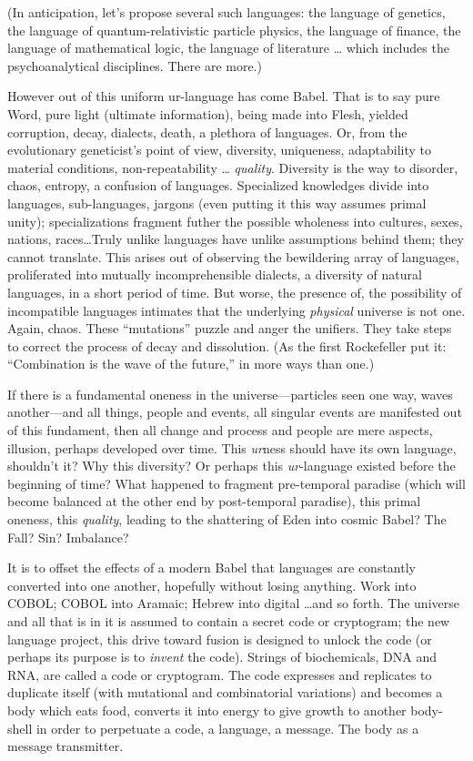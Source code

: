 \documentclass[11pt,twoside,draft]{memoir}
\begin{document}
(In anticipation, let's propose several such languages:
the language of genetics, the language of quantum-relativistic 
particle physics, the language of finance, the language of
mathematical logic, the language of literature \ldots
which includes the psychoanalytical disciplines. There are more.)

However out of this uniform ur-language has come Babel. That is to say pure Word,
pure light (ultimate information), being made into Flesh, yielded corruption, decay,
dialects, death, a plethora of languages. Or, from the evolutionary geneticist's point of
view, diversity, uniqueness, adaptability to material conditions, non-repeatability \ldots
\emph{quality}. Diversity is the way to disorder, chaos, entropy, 
a confusion of languages. Specialized knowledges divide into languages,
sub-languages, jargons (even putting it this way assumes primal unity);
specializations fragment futher the possible wholeness into cultures, sexes, nations,
races\ldots Truly unlike languages have unlike assumptions behind them;
they cannot translate. This arises out of observing the bewildering array of languages, proliferated
into mutually incomprehensible dialects, a diversity of natural languages,
in a short period of time. But worse, the presence of,
the possibility of incompatible languages intimates that the underlying 
\emph{physical} universe is not one. Again, chaos. These \enquote{mutations} 
puzzle and anger the unifiers. They take steps to correct the process of decay and
dissolution. (As the first Rockefeller put it:
\enquote{Combination is the wave of the future,} in more ways than one.)

If there is a fundamental oneness in the
universe---particles seen one way, waves
another---and all things, people and events,
all singular events are manifested out of this
fundament, then all change and process and
people are mere aspects, illusion, perhaps
developed over time. This \emph{ur}ness should
have its own language, shouldn't it? Why
this diversity? Or perhaps this \emph{ur}-language
existed before the beginning of time? What
happened to fragment pre-temporal paradise
(which will become balanced at the other
end by post-temporal paradise), this primal
oneness, this \emph{quality}, leading to the 
shattering of Eden into cosmic Babel? The Fall?
Sin? Imbalance?

It is to offset the effects of a modern Babel that languages are constantly converted into
one another, hopefully without losing anything. Work into COBOL; COBOL into Aramaic;
Hebrew into digital \ldots and so forth.
The universe and all that is in it is assumed to contain a secret code or cryptogram; the
new language project, this drive toward fusion is designed to unlock the code (or
perhaps its purpose is to \emph{invent} the code).
Strings of biochemicals, DNA and RNA, are
called a code or cryptogram. The code expresses and replicates to duplicate itself
(with mutational and combinatorial variations) and becomes a body which eats food,
converts it into energy to give growth to
another body-shell in order to perpetuate a
code, a language, a message. The body as a
message transmitter.
\end{document}
